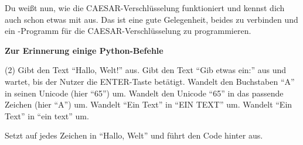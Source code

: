 \documentclass[11pt, a4paper, ngerman]{arbeitsblatt}
\begin{document}
\ReiheTitel

Du weißt nun, wie die CAESAR-Verschlüsselung funktioniert und kennst dich auch
schon etwas mit  aus. Das ist eine gute Gelegenheit, beides zu verbinden
und ein -Programm für die CAESAR-Verschlüsselung zu programmieren.

\begin{rahmen}\textbf{Zur Erinnerung einige Python-Befehle}\small
	\begin{tasks}[style=itemize](2)
		\task{} Gibt den Text \enquote{Hallo, Welt!} aus.
		\task{} Gibt den Text \enquote{Gib etwas ein:} aus
			  und wartet, bis der Nutzer die ENTER-Taste betätigt.
		\task{} Wandelt den Buchstaben \enquote{A} in seinen Unicode (hier \enquote{65}) um.
		\task{} Wandelt den Unicode \enquote{65} in das passende Zeichen (hier \enquote{A}) um.
		\task{} Wandelt \enquote{Ein Text} in \enquote{EIN TEXT} um.
		\task{} Wandelt \enquote{Ein Text} in \enquote{ein text} um.

		\task*{} Setzt  auf jedes Zeichen in \enquote{Hallo, Welt}
		und führt den Code hinter \code{:} aus.
	\end{tasks}
\end{rahmen}
\end{document}
